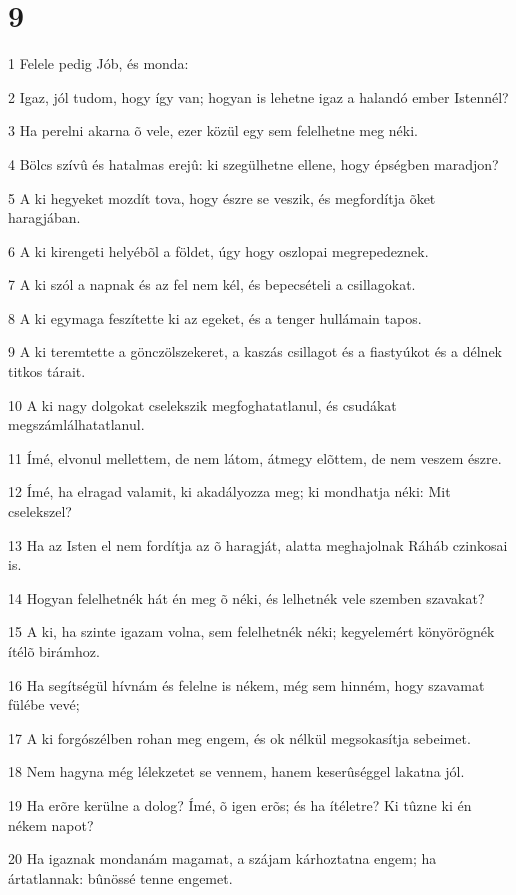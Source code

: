 \chapter{9}

\par 1 Felele pedig Jób, és monda:
\par 2 Igaz, jól tudom, hogy így van; hogyan is lehetne igaz a halandó ember Istennél?
\par 3 Ha perelni akarna õ vele, ezer közül egy sem felelhetne meg néki.
\par 4 Bölcs szívû és hatalmas erejû: ki szegülhetne ellene, hogy épségben maradjon?
\par 5 A ki hegyeket mozdít tova, hogy észre se veszik, és megfordítja õket haragjában.
\par 6 A ki kirengeti helyébõl a földet, úgy hogy oszlopai megrepedeznek.
\par 7 A ki szól a napnak és az fel nem kél, és bepecsételi a csillagokat.
\par 8 A ki egymaga feszítette ki az egeket, és a tenger hullámain tapos.
\par 9 A ki teremtette a gönczölszekeret, a kaszás csillagot és a fiastyúkot és a délnek titkos tárait.
\par 10 A ki nagy dolgokat cselekszik megfoghatatlanul, és csudákat megszámlálhatatlanul.
\par 11 Ímé, elvonul mellettem, de nem látom, átmegy elõttem, de nem veszem észre.
\par 12 Ímé, ha elragad valamit, ki akadályozza meg; ki mondhatja néki: Mit cselekszel?
\par 13 Ha az Isten el nem fordítja az õ haragját, alatta meghajolnak Ráháb czinkosai is.
\par 14 Hogyan felelhetnék hát én meg õ néki, és lelhetnék vele szemben szavakat?
\par 15 A ki, ha szinte igazam volna, sem felelhetnék néki; kegyelemért könyörögnék ítélõ birámhoz.
\par 16 Ha segítségül hívnám és felelne is nékem, még sem hinném, hogy szavamat fülébe vevé;
\par 17 A ki forgószélben rohan meg engem, és ok nélkül megsokasítja sebeimet.
\par 18 Nem hagyna még lélekzetet se vennem, hanem keserûséggel lakatna jól.
\par 19 Ha erõre kerülne a dolog? Ímé, õ igen erõs; és ha ítéletre? Ki tûzne ki én nékem napot?
\par 20 Ha igaznak mondanám magamat, a szájam kárhoztatna engem; ha ártatlannak: bûnössé tenne engemet.
